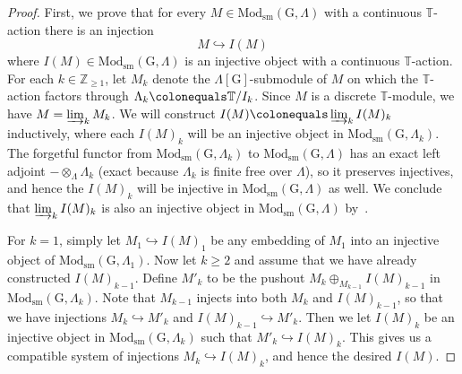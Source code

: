 \documentclass{amsart}
\theoremstyle{remark}
\numberwithin{equation}{subsection}
\newcommand{\Z}{\ZZ}
\newcommand{\ZZ}{{\mathbb Z}}
\newcommand{\defeq}{\colonequals}
\renewcommand{\(}{\left(}
\renewcommand{\)}{\right)}
\begin{document}
\begin{proof} First, we prove that for every $M\in \mathrm{Mod}_{\mathrm{sm}}(\mathrm{G},\Lambda)$ with a continuous $\mathbb{T}$-action there is an injection 
\[
M\hookrightarrow I(M) 
\] 
where $I(M)\in \mathrm{Mod}_{\mathrm{sm}}(\mathrm{G},\Lambda)$ is an injective object with a continuous $\mathbb{T}$-action. For each $k\in \Z_{\geq 1}$, let $M_k$ denote the $\Lambda[\mathrm{G}]$-submodule of $M$ on which the $\mathbb{T}$-action factors through $\Lambda_k\defeq \mathbb{T}/I_{k}$. Since $M$ is a discrete $\mathbb{T}$-module, we have $M=\varinjlim_{k}M_k$. We will construct $I(M)\defeq \varinjlim_{k}I(M)_k$ inductively, where each $I(M)_k$ will be an injective object in $\mathrm{Mod}_{\mathrm{sm}}(\mathrm{G},\Lambda_k)$. The forgetful functor from $\mathrm{Mod}_{\mathrm{sm}}(\mathrm{G}, \Lambda_k)$ to $\mathrm{Mod}_{\mathrm{sm}}(\mathrm{G},\Lambda)$ has an exact left adjoint $-\otimes_{\Lambda}\Lambda_k$ (exact because $\Lambda_k$ is finite free over $\Lambda$), so it preserves injectives, and hence the $I(M)_k$ will be injective in $\mathrm{Mod}_{\mathrm{sm}}(\mathrm{G},\Lambda)$ as well. We conclude that $\varinjlim_{k}I(M)_k$ is also an injective object in $\mathrm{Mod}_{\mathrm{sm}}(\mathrm{G},\Lambda)$ by~\cite[Lemma 2.1.3]{emerton-ord}. 

\medskip

For $k=1$, simply let $M_1 \hookrightarrow I(M)_1$ be any embedding of $M_1$ into an injective object of $\mathrm{Mod}_{\mathrm{sm}}(\mathrm{G},\Lambda_1)$. Now let $k\geq 2$ and assume that we have already constructed $I(M)_{k-1}$. Define $M'_{k}$ to be the pushout $M_k\oplus_{M_{k-1}}I(M)_{k-1}$ in $\mathrm{Mod}_{\mathrm{sm}}(\mathrm{G},\Lambda_k)$. Note that $M_{k-1}$ injects into both $M_k$ and $I(M)_{k-1}$, so that we have injections $M_k\hookrightarrow M'_k$ and $I(M)_{k-1}\hookrightarrow M'_k$. Then we let $I(M)_k$ be an injective object in $\mathrm{Mod}_{\mathrm{sm}}(\mathrm{G},\Lambda_k)$ such that $M'_{k}\hookrightarrow I(M)_k$. This gives us  a compatible system of injections $M_k \hookrightarrow I(M)_k$, and hence the desired $I(M)$.

\medskip


\end{proof}
\end{document}
